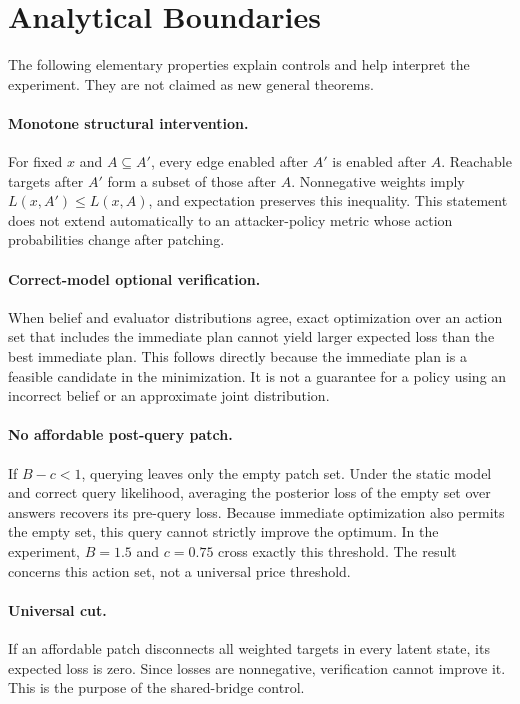\documentclass[manuscript,screen,nonacm]{acmart}
\begin{document}
\section{Analytical Boundaries}
The following elementary properties explain controls and help interpret the experiment. They are not claimed as new general theorems.

\paragraph{Monotone structural intervention.} For fixed $x$ and $A\subseteq A'$, every edge enabled after $A'$ is enabled after $A$. Reachable targets after $A'$ form a subset of those after $A$. Nonnegative weights imply $L(x,A')\le L(x,A)$, and expectation preserves this inequality. This statement does not extend automatically to an attacker-policy metric whose action probabilities change after patching.

\paragraph{Correct-model optional verification.} When belief and evaluator distributions agree, exact optimization over an action set that includes the immediate plan cannot yield larger expected loss than the best immediate plan. This follows directly because the immediate plan is a feasible candidate in the minimization. It is not a guarantee for a policy using an incorrect belief or an approximate joint distribution.

\paragraph{No affordable post-query patch.} If $B-c<1$, querying leaves only the empty patch set. Under the static model and correct query likelihood, averaging the posterior loss of the empty set over answers recovers its pre-query loss. Because immediate optimization also permits the empty set, this query cannot strictly improve the optimum. In the experiment, $B=1.5$ and $c=0.75$ cross exactly this threshold. The result concerns this action set, not a universal price threshold.

\paragraph{Universal cut.} If an affordable patch disconnects all weighted targets in every latent state, its expected loss is zero. Since losses are nonnegative, verification cannot improve it. This is the purpose of the shared-bridge control.
\end{document}
